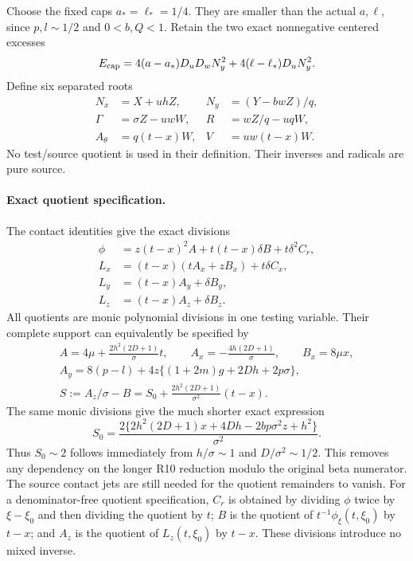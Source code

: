Choose the fixed caps $a_* = \ell_* =1/4$. They are smaller than
the actual $a,\ell$, since $p,l\sim1/2$ and $0<b,Q<1$.
Retain the two exact nonnegative centered excesses
\[
 E_{\rm cap}=4(a-a_*)D_uD_wN_y^2+4(\ell-\ell_*)D_uN_y^2.
\]
Define six separated roots
\[
\begin{aligned}
N_x&=X+uhZ,&N_y&=(Y-bwZ)/q,\\
\Gamma&=\sigma Z-uwW,&R&=wZ/q-uqW,\\
A_\theta&=q(t-x)W,&V&=uw(t-x)W.
\end{aligned}\tag{JR1}
\]
No test/source quotient is used in their definition. Their inverses
and radicals are pure source.

\paragraph{Exact quotient specification.}
The contact identities give the exact divisions
\begin{align*}
 \phi&=z(t-x)^2A+t(t-x)\delta B+t\delta^2C_r,\\
 L_x&=(t-x)(tA_x+zB_x)+t\delta C_x,\\
 L_y&=(t-x)A_y+\delta B_y,\\
 L_z&=(t-x)A_z+\delta B_z.
\end{align*}
All quotients are monic polynomial divisions in one testing variable.
Their complete support can equivalently be specified by
\begin{gather*}
 A=4\mu+\frac{2h^2(2D+1)}\sigma t,\qquad
 A_x=-\frac{4h(2D+1)}\sigma,\qquad B_x=8\mu x,\\
 A_y=8(p-l)+4z\{(1+2m)g+2Dh+2p\sigma\},\\
 S:=A_z/\sigma-B=S_0+
       \frac{2h^2(2D+1)}{\sigma^2}(t-x).
\tag{JR2}
\end{gather*}
The same monic divisions give the much shorter exact expression
\[
 S_0=\frac{2\{2h^2(2D+1)x+4Dh-2bp\sigma^2z+h^2\}}{\sigma^2}.
\tag{JR2a}
\]
Thus $S_0\sim2$ follows immediately from $h/\sigma\sim1$ and
$D/\sigma^2\sim1/2$. This removes any dependency on the longer R10
reduction modulo the original beta numerator. The source contact jets
are still needed for the quotient remainders to vanish.
For a denominator-free quotient specification, $C_r$ is obtained by
dividing $\phi$ twice by $\xi-\xi_0$ and then dividing the quotient
by $t$; $B$ is the quotient of
$t^{-1}\phi_\xi(t,\xi_0)$ by $t-x$; and $A_z$ is the quotient of
$L_z(t,\xi_0)$ by $t-x$. These divisions introduce no mixed inverse.

